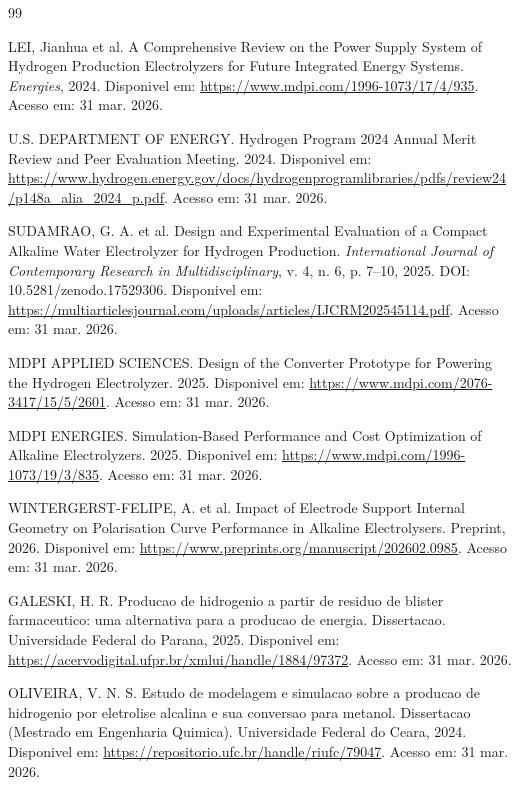 \documentclass[12pt,oneside,a4paper,english,brazilian]{abntex2}
\begin{document}
\begin{thebibliography}{99}

LEI, Jianhua et al. A Comprehensive Review on the Power Supply System of Hydrogen Production Electrolyzers for Future Integrated Energy Systems. \textit{Energies}, 2024. Disponivel em: \url{https://www.mdpi.com/1996-1073/17/4/935}. Acesso em: 31 mar. 2026.

U.S. DEPARTMENT OF ENERGY. Hydrogen Program 2024 Annual Merit Review and Peer Evaluation Meeting. 2024. Disponivel em: \url{https://www.hydrogen.energy.gov/docs/hydrogenprogramlibraries/pdfs/review24/p148a_alia_2024_p.pdf}. Acesso em: 31 mar. 2026.

SUDAMRAO, G. A. et al. Design and Experimental Evaluation of a Compact Alkaline Water Electrolyzer for Hydrogen Production. \textit{International Journal of Contemporary Research in Multidisciplinary}, v. 4, n. 6, p. 7--10, 2025. DOI: 10.5281/zenodo.17529306. Disponivel em: \url{https://multiarticlesjournal.com/uploads/articles/IJCRM202545114.pdf}. Acesso em: 31 mar. 2026.

MDPI APPLIED SCIENCES. Design of the Converter Prototype for Powering the Hydrogen Electrolyzer. 2025. Disponivel em: \url{https://www.mdpi.com/2076-3417/15/5/2601}. Acesso em: 31 mar. 2026.

MDPI ENERGIES. Simulation-Based Performance and Cost Optimization of Alkaline Electrolyzers. 2025. Disponivel em: \url{https://www.mdpi.com/1996-1073/19/3/835}. Acesso em: 31 mar. 2026.

WINTERGERST-FELIPE, A. et al. Impact of Electrode Support Internal Geometry on Polarisation Curve Performance in Alkaline Electrolysers. Preprint, 2026. Disponivel em: \url{https://www.preprints.org/manuscript/202602.0985}. Acesso em: 31 mar. 2026.

GALESKI, H. R. Producao de hidrogenio a partir de residuo de blister farmaceutico: uma alternativa para a producao de energia. Dissertacao. Universidade Federal do Parana, 2025. Disponivel em: \url{https://acervodigital.ufpr.br/xmlui/handle/1884/97372}. Acesso em: 31 mar. 2026.

OLIVEIRA, V. N. S. Estudo de modelagem e simulacao sobre a producao de hidrogenio por eletrolise alcalina e sua conversao para metanol. Dissertacao (Mestrado em Engenharia Quimica). Universidade Federal do Ceara, 2024. Disponivel em: \url{https://repositorio.ufc.br/handle/riufc/79047}. Acesso em: 31 mar. 2026.


\end{thebibliography}
\end{document}
